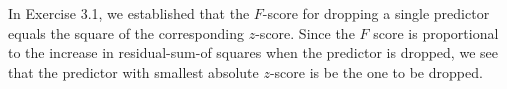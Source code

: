 

In Exercise 3.1, we established that the $F$-score for dropping a single predictor equals the square
of the corresponding $z$-score. Since the $F$ score is proportional to the increase in residual-sum-of 
squares when the predictor is dropped, we see that the predictor with smallest absolute $z$-score is be the one to be dropped.